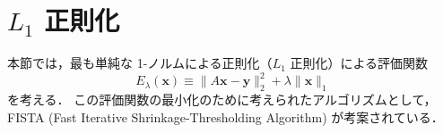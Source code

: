 %

\section[L1 正則化]{$L_1$ 正則化}

本節では，最も単純な 1-ノルムによる正則化（$L_1$ 正則化）による評価関数
\begin{equation}
    E_{\lambda}(\bm{x}) \equiv \|A \bm{x} - \bm{y}\|_2^2 + \lambda \|\bm{x}\|_1
    \label{eq:regularization_sparse_l1_objective}
\end{equation}
を考える．
この評価関数の最小化のために考えられたアルゴリズムとして，
FISTA (Fast Iterative Shrinkage-Thresholding Algorithm) \cite{Beck2009}
が考案されている．

